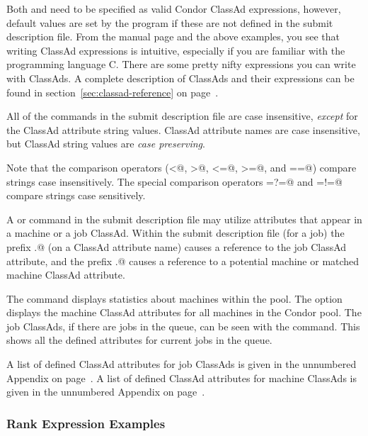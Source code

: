 Both  and  need to be specified 
as valid Condor ClassAd expressions, however, default values are set by the
 program if these are not defined in the submit description file.
From the  manual page and the above examples, you see
that writing ClassAd expressions is intuitive, especially if you
are familiar with the programming language C.  There are some
pretty nifty expressions you can write with ClassAds.
A complete description of ClassAds and their expressions
can be found in section~\ref{sec:classad-reference} on 
page~\pageref{sec:classad-reference}.

All of the commands in the submit description file are case insensitive, 
\emph{except} for the ClassAd attribute string values.
ClassAd attribute names are
case insensitive, but ClassAd string
values are \emph{case preserving}.

Note that the comparison operators
(\verb@<@, \verb@>@, \verb@<=@, \verb@>=@, and \verb@==@)
compare strings
case insensitively.  The special comparison operators 
\verb@=?=@ and \verb@=!=@
compare strings case sensitively.

A   or  command in
the submit description file may utilize attributes
that appear in a machine or a job ClassAd.
Within the submit description file (for a job) the
prefix \verb@MY.@ (on a ClassAd attribute name)
causes a reference to the job ClassAd attribute,
and the prefix \verb@TARGET.@ causes a reference to 
a potential machine or matched machine ClassAd attribute.

The  command displays
statistics about machines within the pool.
The  option displays the
machine ClassAd attributes for all machines in the Condor pool.
The job ClassAds, if there are jobs in the queue, can be seen
with the  command.
This shows all the defined attributes for current jobs in the queue.

A list of defined ClassAd attributes for job ClassAds
is given in the unnumbered Appendix on 
page~\pageref{sec:Job-ClassAd-Attributes}.
A list of defined ClassAd attributes for machine ClassAds
is given in the unnumbered Appendix on 
page~\pageref{sec:Machine-ClassAd-Attributes}.


\subsubsection{\label{rank-examples}Rank Expression Examples}

